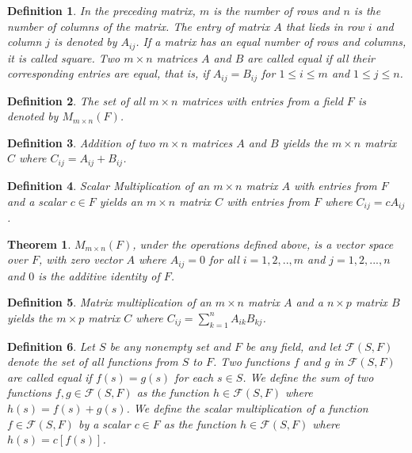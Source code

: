 \documentclass[a4paper]{article}
\newtheorem{mytheorem}{Theorem}
\newtheorem{mydef}{Definition}
\numberwithin{mytheorem}{section}
\numberwithin{mydef}{section}
\numberwithin{example}{section}
\begin{document}
\begin{mydef} In the preceding matrix, $m$ is the number of rows and $n$ is the number of columns of the matrix. The entry of matrix $A$ that lieds in row $i$ and column $j$ is denoted by $A_{ij}$. If a matrix has an equal number of rows and columns, it is called square. Two $m \times n$ matrices $A$ and $B$ are called equal if all their corresponding entries are equal, that is, if $A_{ij} = B_{ij}$ for $1 \leq i \leq m$ and $1 \leq j \leq n$. 
\end{mydef}

\begin{mydef} The set of all $m \times n$ matrices with entries from a field $F$ is denoted by $M_{m \times n}(F)$.  
\end{mydef}

\begin{mydef} Addition of two $m \times n$ matrices $A$ and $B$ yields the $m \times n$ matrix $C$ where $C_{ij} = A_{ij} + B_{ij}$.  
\end{mydef}

\begin{mydef} Scalar Multiplication of an $m \times n$ matrix $A$ with entries from $F$ and a scalar $c \in F$ yields an $m \times n$ matrix $C$ with entries from $F$ where $C_{ij} = cA_{ij}$. 
\end{mydef}

\begin{mytheorem} $M_{m \times n}(F)$, under the operations defined above, is a vector space over $F$, with zero vector $A$ where $A_{ij} = 0$ for all $i = 1,2,..,m$ and $j = 1,2,...,n$ and $0$ is the additive identity of $F$. \end{mytheorem}

\begin{mydef} Matrix multiplication of an $m \times n$ matrix $A$ and a $n \times p$ matrix $B$ yields the $m \times p$ matrix $C$ where $C_{ij} = \sum^{n}_{k = 1} A_{ik}B_{kj}$.  
\end{mydef}

\begin{mydef} Let $S$ be any nonempty set and $F$ be any field, and let $\mathcal{F}(S,F)$ denote the set of all functions from $S$ to $F$. Two functions $f$ and $g$ in $\mathcal{F}(S,F)$ are called equal if $f(s) = g(s)$ for each $s \in S$. We define the sum of two functions $f,g \in \mathcal{F}(S,F)$ as the function $h \in \mathcal{F}(S,F) $ where $h(s) = f(s) + g(s)$. We define the scalar multiplication of a function $f \in \mathcal{F}(S,F) $ by a scalar $c \in F$ as the function $h \in \mathcal{F}(S,F) $ where $h(s) = c[f(s)]$.  
\end{mydef}
\end{document}

